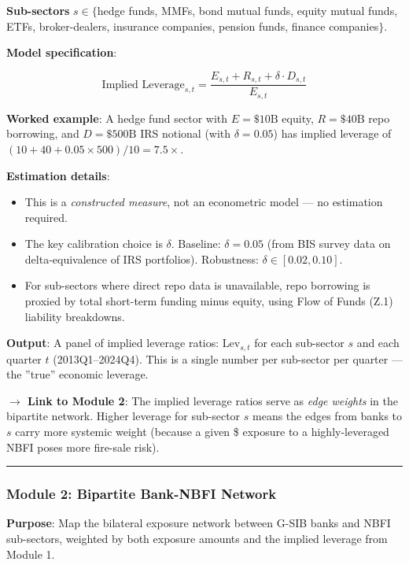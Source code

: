 \documentclass[11pt,a4paper]{article}
\begin{document}
\textbf{Sub-sectors} $s \in \{$hedge funds, MMFs, bond mutual funds, equity mutual funds, ETFs, broker-dealers, insurance companies, pension funds, finance companies$\}$.

\textbf{Model specification}:

\[\text{Implied Leverage}_{s,t} = \frac{E_{s,t} + R_{s,t} + \delta \cdot D_{s,t}}{E_{s,t}}\]

\textbf{Worked example}: A hedge fund sector with $E = \$10\text{B}$ equity, $R = \$40\text{B}$ repo borrowing, and $D = \$500\text{B}$ IRS notional (with $\delta = 0.05$) has implied leverage of $(10 + 40 + 0.05 \times 500)/10 = 7.5\times$.

\textbf{Estimation details}:
\begin{itemize}
\item This is a \textit{constructed measure}, not an econometric model --- no estimation required.
\item The key calibration choice is $\delta$. Baseline: $\delta = 0.05$ (from BIS survey data on delta-equivalence of IRS portfolios). Robustness: $\delta \in [0.02, 0.10]$.
\item For sub-sectors where direct repo data is unavailable, repo borrowing is proxied by total short-term funding minus equity, using Flow of Funds (Z.1) liability breakdowns.

\end{itemize}
\textbf{Output}: A panel of implied leverage ratios: $\text{Lev}_{s,t}$ for each sub-sector $s$ and each quarter $t$ (2013Q1--2024Q4). This is a single number per sub-sector per quarter --- the ''true'' economic leverage.

\textbf{$\rightarrow$ Link to Module 2}: The implied leverage ratios serve as \textit{edge weights} in the bipartite network. Higher leverage for sub-sector $s$ means the edges from banks to $s$ carry more systemic weight (because a given \$ exposure to a highly-leveraged NBFI poses more fire-sale risk).


\bigskip\noindent\rule{\textwidth}{0.4pt}\bigskip


\subsubsection{Module 2: Bipartite Bank-NBFI Network}

\textbf{Purpose}: Map the bilateral exposure network between G-SIB banks and NBFI sub-sectors, weighted by both exposure amounts and the implied leverage from Module 1.
\end{document}
